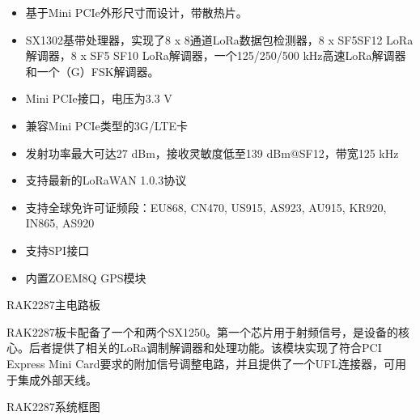 \documentclass[a4paper,12pt,english]{sphinxmanual}
\begin{document}
\sphinxAtStartPar
{}
\begin{itemize}
\item {} 
\sphinxAtStartPar
基于Mini PCI\sphinxhyphen{}e外形尺寸而设计，带散热片。

\item {} 
\sphinxAtStartPar
SX1302基带处理器，实现了8 x 8通道LoRa数据包检测器，8 x SF5\sphinxhyphen{}SF12 LoRa解调器，8 x SF5\sphinxhyphen{} SF10 LoRa解调器，一个125/250/500 kHz高速LoRa解调器和一个（G）FSK解调器。

\item {} 
\sphinxAtStartPar
Mini PCI\sphinxhyphen{}e接口，电压为3.3 V

\item {} 
\sphinxAtStartPar
兼容Mini PCI\sphinxhyphen{}e类型的3G/LTE卡

\item {} 
\sphinxAtStartPar
发射功率最大可达27 dBm，接收灵敏度低至\sphinxhyphen{}139 dBm@SF12，带宽125 kHz

\item {} 
\sphinxAtStartPar
支持最新的LoRaWAN 1.0.3协议

\item {} 
\sphinxAtStartPar
支持全球免许可证频段：EU868, CN470, US915, AS923, AU915, KR920, IN865, AS920

\item {} 
\sphinxAtStartPar
支持SPI接口

\item {} 
\sphinxAtStartPar
内置ZOE\sphinxhyphen{}M8Q GPS模块

\end{itemize}

\sphinxAtStartPar
{}

\sphinxAtStartPar
{}

\sphinxAtStartPar
RAK2287主电路板

\sphinxAtStartPar
{}

\sphinxAtStartPar
RAK2287板卡配备了一个和两个SX1250。第一个芯片用于射频信号，是设备的核心。后者提供了相关的LoRa调制解调器和处理功能。该模块实现了符合PCI Express Mini Card要求的附加信号调整电路，并且提供了一个UFL连接器，可用于集成外部天线。

\sphinxAtStartPar
{}

\sphinxAtStartPar
RAK2287系统框图
\end{document}
